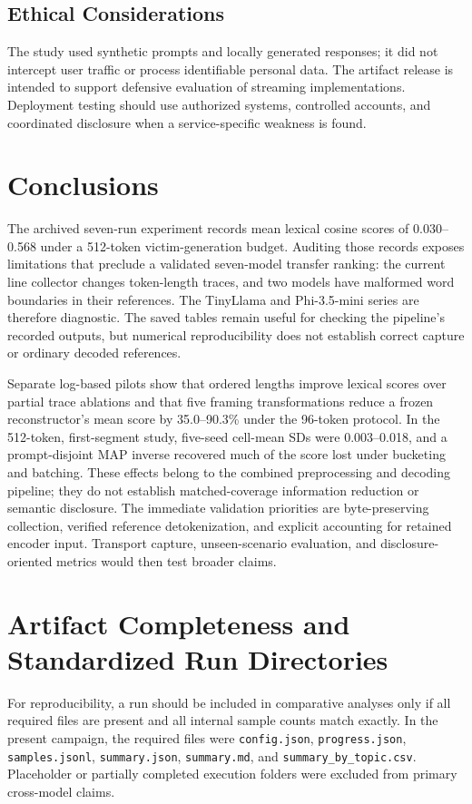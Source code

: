 \documentclass[electronics,article,submit,pdftex,moreauthors]{Definitions/mdpi}
\begin{document}
\subsection{Ethical Considerations}
The study used synthetic prompts and locally generated responses; it did not intercept user traffic or process identifiable personal data. The artifact release is intended to support defensive evaluation of streaming implementations. Deployment testing should use authorized systems, controlled accounts, and coordinated disclosure when a service-specific weakness is found.

\section{Conclusions}
The archived seven-run experiment records mean lexical cosine scores of 0.030--0.568 under a 512-token victim-generation budget. Auditing those records exposes limitations that preclude a validated seven-model transfer ranking: the current line collector changes token-length traces, and two models have malformed word boundaries in their references. The TinyLlama and Phi-3.5-mini series are therefore diagnostic. The saved tables remain useful for checking the pipeline's recorded outputs, but numerical reproducibility does not establish correct capture or ordinary decoded references.

Separate log-based pilots show that ordered lengths improve lexical scores over partial trace ablations and that five framing transformations reduce a frozen reconstructor's mean score by 35.0--90.3\% under the 96-token protocol. In the 512-token, first-segment study, five-seed cell-mean SDs were 0.003--0.018, and a prompt-disjoint MAP inverse recovered much of the score lost under bucketing and batching. These effects belong to the combined preprocessing and decoding pipeline; they do not establish matched-coverage information reduction or semantic disclosure. The immediate validation priorities are byte-preserving collection, verified reference detokenization, and explicit accounting for retained encoder input. Transport capture, unseen-scenario evaluation, and disclosure-oriented metrics would then test broader claims.

\appendixstart
\appendix
\section{Artifact Completeness and Standardized Run Directories}\label{app:runs}
For reproducibility, a run should be included in comparative analyses only if all required files are present and all internal sample counts match exactly. In the present campaign, the required files were \texttt{config.json}, \texttt{progress.json}, \texttt{samples.jsonl}, \texttt{summary.json}, \texttt{summary.md}, and \texttt{summary\_by\_topic.csv}. Placeholder or partially completed execution folders were excluded from primary cross-model claims.
\end{document}
